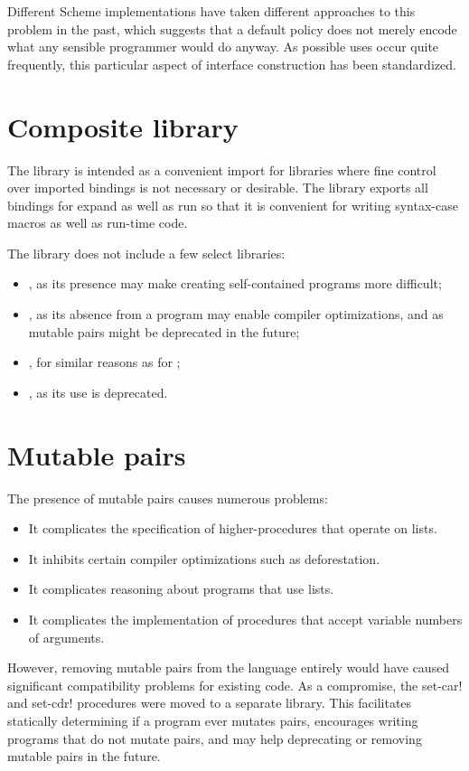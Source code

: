 \documentclass[twoside,twocolumn]{algol60}
\begin{document}
Different Scheme implementations have taken different approaches to
this problem in the past, which suggests that a default policy does
not merely encode what any sensible programmer would do anyway.  As
possible uses occur quite frequently, this particular aspect of
interface construction has been standardized.


\chapter{Composite library}

The \thersixlibrary{} library is intended as a convenient import for
libraries where fine control over imported bindings is not necessary
or desirable. The \thersixlibrary{} library exports all bindings for
{\cf expand} as well as {\cf run} so that it is convenient for writing
{\cf syntax-case} macros as well as run-time code.

The \rsixlibrary{} library does not include a few select libraries:
%
\begin{itemize}
\item {}, as its presence may make creating
  self-contained programs more difficult;
\item {}, as its absence from a program may enable compiler
  optimizations, and as mutable pairs might be deprecated in the future;
\item {}, for similar reasons as for
  ;
\item {}, as its use is deprecated.
\end{itemize}


\chapter{Mutable pairs}

The presence of mutable pairs causes numerous problems:
%
\begin{itemize}
\item It complicates the specification of higher-procedures that
  operate on lists.
\item It inhibits certain compiler optimizations such as
  deforestation.
\item It complicates reasoning about programs that use lists.
\item It complicates the implementation of procedures that accept
  variable numbers of arguments.
\end{itemize}
%
However, removing mutable pairs from the language entirely would have
caused significant compatibility problems for existing code.  As a
compromise, the {\cf set-car!} and {\cf set-cdr!} procedures were
moved to a separate library.  This facilitates statically determining
if a program ever mutates pairs, encourages writing programs that do
not mutate pairs, and may help deprecating or removing mutable pairs
in the future.
\end{document}
